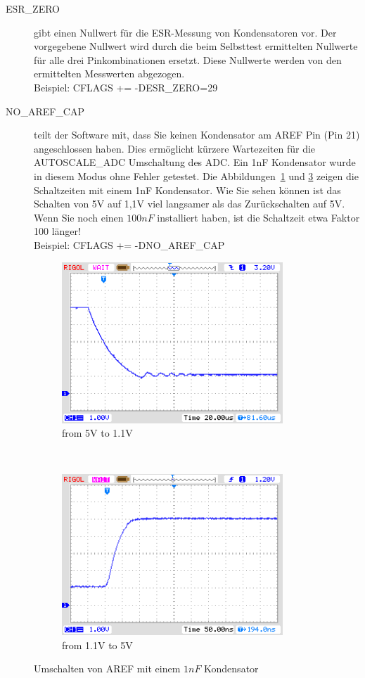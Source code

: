 \begin{description}
  \item[ESR\_ZERO] gibt einen Nullwert für die ESR-Messung von Kondensatoren vor.
Der vorgegebene Nullwert wird durch die beim Selbsttest ermittelten Nullwerte für alle drei Pinkombinationen ersetzt.
 Diese Nullwerte werden von den ermittelten Messwerten abgezogen.\\
Beispiel: CFLAGS += -DESR\_ZERO=29

  \item[NO\_AREF\_CAP] teilt der Software mit, dass Sie keinen Kondensator am AREF Pin (Pin 21) angeschlossen haben.
Dies ermöglicht kürzere Wartezeiten für die AUTOSCALE\_ADC Umschaltung des ADC.
Ein 1nF Kondensator wurde in diesem Modus ohne Fehler getestet.
Die Abbildungen~\ref{pic:aref1} und \ref{pic:aref5} zeigen die Schaltzeiten mit einem 1nF Kondensator.
Wie Sie sehen können ist das Schalten von 5V auf 1,1V viel langsamer als das Zurückschalten auf 5V.
Wenn Sie noch einen \(100 nF\) installiert haben, ist die Schaltzeit etwa Faktor 100 länger!\\
Beispiel: CFLAGS += -DNO\_AREF\_CAP

\end{description}

\begin{figure}[H]
  \begin{subfigure}[b]{8.6cm}
    \centering
    \includegraphics[width=8.3cm]{../PNG/AREF2_1V.png}
    \caption{from 5V to 1.1V }
    \label{pic:aref1}
  \end{subfigure}
  ~
  \begin{subfigure}[b]{8.6cm}
    \centering
    \includegraphics[width=8.3cm]{../PNG/AREF2VCC.png}
    \caption{from 1.1V to 5V}
    \label{pic:aref5}
  \end{subfigure}
  \caption{Umschalten von AREF mit einem \(1nF\) Kondensator}
\end{figure}

